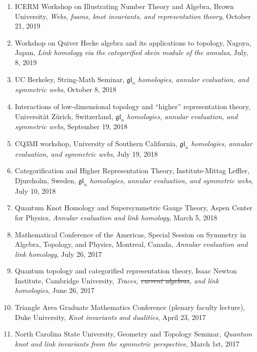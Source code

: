 \documentclass[10pt]{article}
\begin{document}
\begin{enumerate}
\item ICERM Workshop on Illustrating Number Theory and Algebra, 
Brown University, 
\emph{Webs, foams, knot invariants, and representation theory},
October 21, 2019

\item Workshop on Quiver Hecke algebra and its applications to topology, 
Nagoya, Japan, 
\emph{Link homology via the categorified skein module of the annulus},
July, 8, 2019

\item UC Berkeley, String-Math Seminar,
\emph{$\mathfrak{gl}_n$ homologies, annular evaluation, and symmetric webs},
October 8, 2018

\item Interactions of low-dimensional topology and ``higher'' representation theory,
Universit\"{a}t Z\"{u}rich, Switzerland,
\emph{$\mathfrak{gl}_n$ homologies, annular evaluation, and symmetric webs},
September 19, 2018

\item CQ3MI workshop,
University of Southern California, 
\emph{$\mathfrak{gl}_n$ homologies, annular evaluation, and symmetric webs},
July 19, 2018

\item Categorification and Higher Representation Theory,
Institute-Mittag Leffler, Djursholm, Sweden,
\emph{$\mathfrak{gl}_n$ homologies, annular evaluation, and symmetric webs},
July 10, 2018

\item Quantum Knot Homology and Supersymmetric Gauge Theory, 
Aspen Center for Physics, 
\emph{Annular evaluation and link homology},
March 5, 2018

\item Mathematical Conference of the Americas,
Special Session on Symmetry in Algebra, Topology, and Physics,
Montreal, Canada,
\emph{Annular evaluation and link homology},
July 26, 2017

\item Quantum topology and categorified representation theory, 
Isaac Newton Institute, Cambridge University, 
\emph{Traces, \sout{current algebras}, and link homologies}, 
June 26, 2017

\item Triangle Area Graduate Mathematics Conference (plenary faculty lecture), 
Duke University, 
\emph{Knot invariants and dualities}, 
April 23, 2017

\item North Carolina State University, Geometry and Topology Seminar, 
\emph{Quantum knot and link invariants from the symmetric perspective},
March 1st, 2017


\end{enumerate}
\end{document}
